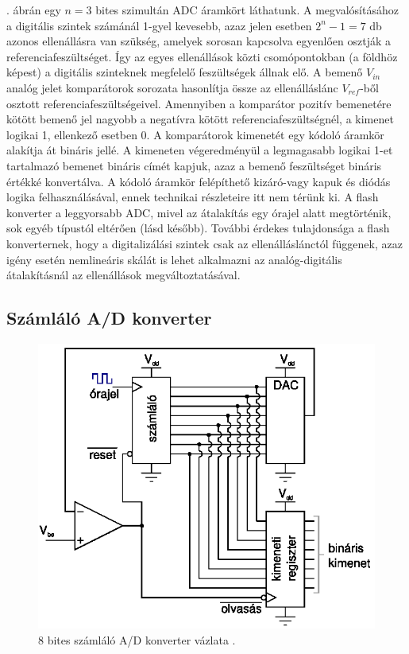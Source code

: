 \documentclass[12pt]{article}
\theoremstyle{plain}
\begin{document}
. ábrán egy $n=3$ bites szimultán ADC áramkört láthatunk. A megvalósításához a digitális szintek számánál 1-gyel kevesebb, azaz jelen esetben $2^n - 1 = 7$ db azonos ellenállásra van szükség, amelyek sorosan kapcsolva egyenlően osztják a referenciafeszültséget. Így az egyes ellenállások közti csomópontokban (a földhöz képest) a digitális szinteknek megfelelő feszültségek állnak elő. A bemenő $V_{in}$ analóg jelet komparátorok sorozata hasonlítja össze az ellenálláslánc $V_{ref}$-ből osztott referenciafeszültségeivel. Amennyiben a komparátor pozitív bemenetére kötött bemenő jel nagyobb a negatívra kötött referenciafeszültségnél, a kimenet logikai 1, ellenkező esetben 0. A komparátorok kimenetét egy kódoló áramkör alakítja át bináris jellé. A kimeneten végeredményül a legmagasabb logikai 1-et tartalmazó bemenet bináris címét kapjuk, azaz a bemenő feszültséget bináris értékké konvertálva. A kódoló áramkör felépíthető kizáró-vagy kapuk és diódás logika felhasználásával, ennek technikai részleteire itt nem térünk ki. A flash konverter a leggyorsabb ADC, mivel az átalakítás egy órajel alatt megtörténik, sok egyéb típustól eltérően (lásd később). További érdekes tulajdonsága a flash konverternek, hogy a digitalizálási szintek csak az ellenálláslánctól függenek, azaz igény esetén nemlineáris skálát is lehet alkalmazni az analóg-digitális átalakításnál az ellenállások megváltoztatásával.



\subsection{Számláló A/D konverter \cite{Bagoly}}

\begin{figure}[]
	\centering
	\includegraphics[width=0.7\linewidth]{media/ADC_szamlalo}
	\caption{8 bites számláló A/D konverter vázlata \cite{Bagoly}.}
	\label{fig:adcszamlalo}
\end{figure}
\end{document}
